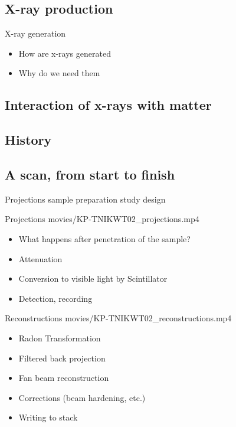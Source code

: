 \documentclass[aspectratio=169,10pt]{beamer}
\begin{document}
\subsection{X-ray production}
\begin{frame}{X-ray generation}
	\begin{itemize}
		\item How are x-rays generated
		\item  Why do we need them
	\end{itemize}
\end{frame}

\subsection{Interaction of x-rays with matter}

\subsection{History}
\cite{Cormack1963a}



\subsection{A scan, from start to finish}
\begin{frame}[allowframebreaks]{Projections}
	sample preparation
	study design
\end{frame}

\begin{frame}[allowframebreaks]{Projections}
	movies/KP-TNIKWT02\_projections.mp4
	\framebreak
	\begin{itemize}
		\item What happens after penetration of the sample?
		\item Attenuation
		\item Conversion to visible light by Scintillator
		\item Detection, recording
	\end{itemize}
\end{frame}

\begin{frame}[allowframebreaks]{Reconstructions}
	movies/KP-TNIKWT02\_reconstructions.mp4
	\framebreak
	\begin{itemize}
		\item Radon Transformation
		\item Filtered back projection
		\item Fan beam reconstruction
		\item Corrections (beam hardening, etc.)
		\item Writing to stack
	\end{itemize}
\end{frame}
\end{document}

